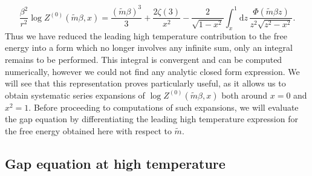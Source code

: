 \documentclass[a4paper,11pt]{article}
\newcommand{\dd}{\mathrm d}
\begin{document}
\begin{equation}
 \frac{\beta^2}{r^2}\log Z^{(0)}(\tilde m\beta,x)
 =\frac{(\tilde m\beta)^3}{3}+\frac{2\zeta(3)}{x^2}
 -\frac{2}{\sqrt{1-x^2}}
 \int_x^1\dd z\,
 \frac{\Phi(\tilde m\beta z)}{z^2\sqrt{z^2-x^2}}.
 \label{eq:physical-functional}
\end{equation}
Thus we have reduced the leading high temperature contribution to the free energy  into a form which no longer involves any infinite sum, only an integral remains to be performed. This integral is convergent and can be computed numerically, however we could not find any analytic closed form expression. We will see that 
this representation proves particularly useful,  as it allows us to obtain systematic series expansions of $\log Z^{(0)}(\tilde m \beta,x)$ both around $x=0$ and $x^2=1$. Before proceeding to computations of such expansions, we will evaluate the gap equation by differentiating the leading high temperature expression for the free energy obtained here with respect to $\tilde m$.
\subsection{Gap equation at high temperature}
\label{sec:gap}
\end{document}
